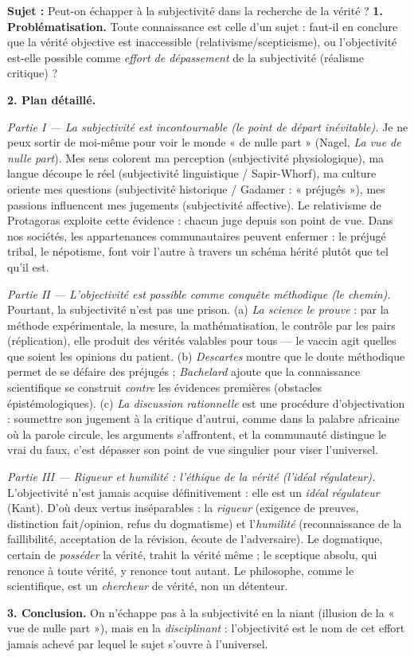 \documentclass[11pt]{article}
\begin{document}
\begin{exoresolu}
\textbf{Sujet :} Peut-on échapper à la subjectivité dans la recherche de la vérité ?
\tcblower
\textbf{1. Problématisation.} Toute connaissance est celle d'un sujet : faut-il en conclure que la vérité objective est inaccessible (relativisme/scepticisme), ou l'objectivité est-elle possible comme \emph{effort de dépassement} de la subjectivité (réalisme critique) ?

\textbf{2. Plan détaillé.}

\emph{Partie I — La subjectivité est incontournable (le point de départ inévitable).} Je ne peux sortir de moi-même pour voir le monde « de nulle part » (Nagel, \emph{La vue de nulle part}). Mes sens colorent ma perception (subjectivité physiologique), ma langue découpe le réel (subjectivité linguistique / Sapir-Whorf), ma culture oriente mes questions (subjectivité historique / Gadamer : « préjugés »), mes passions influencent mes jugements (subjectivité affective). Le relativisme de Protagoras exploite cette évidence : chacun juge depuis son point de vue. Dans nos sociétés, les appartenances communautaires peuvent enfermer : le préjugé tribal, le népotisme, font voir l'autre à travers un schéma hérité plutôt que tel qu'il est.

\emph{Partie II — L'objectivité est possible comme conquête méthodique (le chemin).} Pourtant, la subjectivité n'est pas une prison. (a) \emph{La science le prouve} : par la méthode expérimentale, la mesure, la mathématisation, le contrôle par les pairs (réplication), elle produit des vérités valables pour tous — le vaccin agit quelles que soient les opinions du patient. (b) \emph{Descartes} montre que le doute méthodique permet de se défaire des préjugés ; \emph{Bachelard} ajoute que la connaissance scientifique se construit \emph{contre} les évidences premières (obstacles épistémologiques). (c) \emph{La discussion rationnelle} est une procédure d'objectivation : soumettre son jugement à la critique d'autrui, comme dans la palabre africaine où la parole circule, les arguments s'affrontent, et la communauté distingue le vrai du faux, c'est dépasser son point de vue singulier pour viser l'universel.

\emph{Partie III — Rigueur et humilité : l'éthique de la vérité (l'idéal régulateur).} L'objectivité n'est jamais acquise définitivement : elle est un \emph{idéal régulateur} (Kant). D'où deux vertus inséparables : la \emph{rigueur} (exigence de preuves, distinction fait/opinion, refus du dogmatisme) et l'\emph{humilité} (reconnaissance de la faillibilité, acceptation de la révision, écoute de l'adversaire). Le dogmatique, certain de \emph{posséder} la vérité, trahit la vérité même ; le sceptique absolu, qui renonce à toute vérité, y renonce tout autant. Le philosophe, comme le scientifique, est un \emph{chercheur} de vérité, non un détenteur.

\textbf{3. Conclusion.} On n'échappe pas à la subjectivité en la niant (illusion de la « vue de nulle part »), mais en la \emph{disciplinant} : l'objectivité est le nom de cet effort jamais achevé par lequel le sujet s'ouvre à l'universel.
\end{exoresolu}
\end{document}
